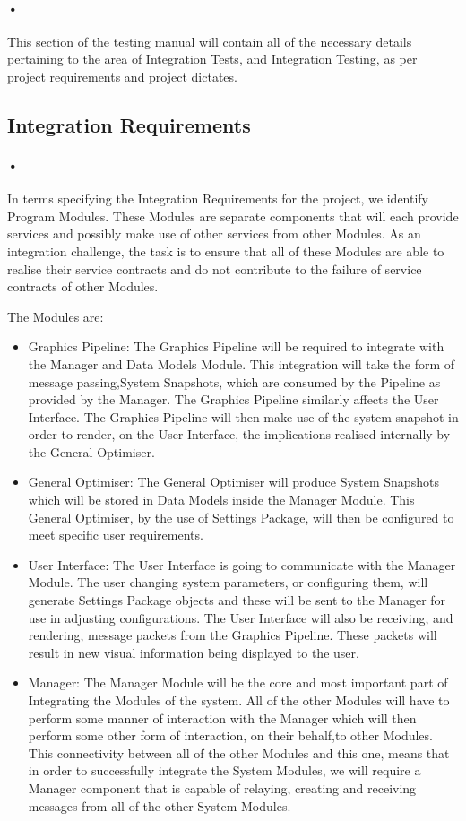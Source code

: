 \documentclass[11pt]{article}
\begin{document}
\paragraph{•}
This section of the testing manual will contain all of the necessary details pertaining to the area of Integration Tests, and Integration Testing, as per project requirements and project dictates.
\subsection{Integration Requirements}
\paragraph{•}
In terms specifying the Integration Requirements for the project, we identify Program Modules. These Modules are separate components that will each provide services and possibly make use of other services from other Modules. As an integration challenge, the task is to ensure that all of these Modules are able to realise their service contracts and do not contribute to the failure of service contracts of other Modules.

The Modules are:
\begin{itemize}
\item Graphics Pipeline: The Graphics Pipeline will be required to integrate with the Manager and Data Models Module. This integration will take the form of message passing,System Snapshots, which are consumed by the Pipeline as provided by the Manager. The Graphics Pipeline similarly affects the User Interface. The Graphics Pipeline will then make use of the system snapshot in order to render, on the User Interface, the implications realised internally by the General Optimiser.
\item General Optimiser: The General Optimiser will produce System Snapshots which will be stored in Data Models inside the Manager Module. This General Optimiser, by the use of Settings Package, will then be configured to meet specific user requirements. 
\item User Interface: The User Interface is going to communicate with the Manager Module. The user changing system parameters, or configuring them, will generate Settings Package objects and these will be sent to the Manager for use in adjusting configurations. The User Interface will also be receiving, and rendering, message packets from the Graphics Pipeline. These packets will result in new visual information being displayed to the user.
\item Manager: The Manager Module will be the core and most important part of Integrating the Modules of the system. All of the other Modules will have to perform some manner of interaction with the Manager which will then perform some other form of interaction, on their behalf,to other Modules. This connectivity between all of the other Modules and this one, means that in order to successfully integrate the System Modules, we will require a Manager component that is capable of relaying, creating and receiving messages from all of the other System Modules.

\end{itemize}
 
\end{document}
